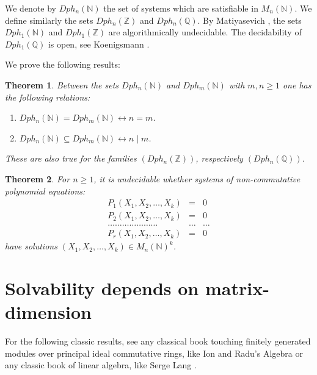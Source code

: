 \documentclass{article}
\theoremstyle{plain}
\newtheorem{theorem}{Theorem}[section]
\theoremstyle{definition}
\begin{document}
We denote by $Dph_n(\mathbb N)$ the set of systems which  are satisfiable in $M_n(\mathbb N)$. We define similarly the sets $Dph_n(\mathbb Z)$ and $Dph_n(\mathbb Q)$. By Matiyasevich \cite{Matiyasevich}, the sets $Dph_1(\mathbb N)$ and $Dph_1(\mathbb Z)$ are algorithmically undecidable. The decidability of $Dph_1(\mathbb Q)$ is open, see Koenigsmann \cite{Koenigsmann}.

We prove the following results:

\begin{theorem}\label{diophantinetheories}
Between the sets $Dph_n(\mathbb N)$ and $Dph_m(\mathbb N)$  with $m, n \geq 1$ one has the following relations:
\begin{enumerate}
\item $Dph_n(\mathbb N) = Dph_m(\mathbb N) \longleftrightarrow n = m$.
\item $Dph_n(\mathbb N) \subseteq Dph_m(\mathbb N) \longleftrightarrow n \mid m$.
\end{enumerate}
These are also true for the families  $\left (Dph_n(\mathbb Z)\right )$, respectively $\left (Dph_n( \mathbb Q) \right )$.
\end{theorem}

\begin{theorem}\label{theoremundecidability}
For $n \geq 1$, it is undecidable whether systems of non-commutative polynomial equations:
\begin{eqnarray*}
P_1(X_1, X_2, \dots, X_k) &=&0 \\
P_2(X_1, X_2, \dots, X_k) &=&0 \\
\dots \dots \dots \dots \dots \dots \dots &\dots& \dots \\
P_r(X_1, X_2, \dots, X_k) &=&0
\end{eqnarray*}
have solutions $(X_1, X_2, \dots, X_k) \in M_n(\mathbb N)^k$. 
\end{theorem}



\section{Solvability depends on matrix-dimension}\label{sect:divide}

For the following classic results, see any classical book touching finitely generated modules over principal ideal commutative rings, like Ion and Radu's Algebra  \cite{IonRadu} or any classic book of linear algebra, like Serge Lang \cite{Lang}. 
\end{document}
